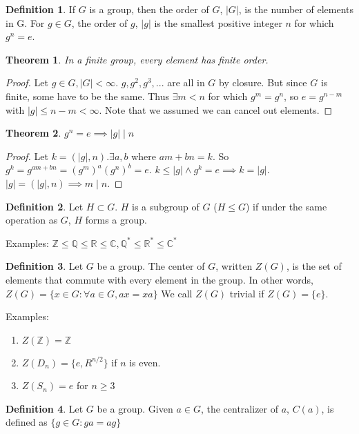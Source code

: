 \documentclass{article}
\theoremstyle{definition}
\newtheorem{definition}{Definition}
\theoremstyle{plain}
\newtheorem{theorem}{Theorem}
\theoremstyle{corollary}
\theoremstyle{lemma}
\begin{document}
\begin{definition}
If $G$ is a group, then the order of $G$, $|G|$, is the number of elements in G.
For $g\in G$, the order of $g$, $|g|$ is the smallest positive integer $n$ for which $g^n=e$. 
\end{definition}

\begin{theorem}
In a finite group, every element has finite order.
\end{theorem}
\begin{proof}
Let $g\in G, |G|<\infty$. $g,g^2,g^3,...$ are all in $G$ by closure. But since $G$ is finite, some have to be the same. Thus $\exists m<n$ for which $g^m=g^n$, so $e=g^{n-m}$ with $|g|\leq n-m<\infty$. Note that we assumed we can cancel out elements. 
\end{proof}

\begin{theorem}
    $g^n=e\implies|g|\mid n$
\end{theorem}
\begin{proof}
Let $k=(|g|,n). \exists a,b$ where $am+bn=k$. So $g^k=g^{am+bn}=(g^m)^a(g^n)^b=e$. $k\leq |g| \land g^k=e\implies k=|g|$. $|g|=(|g|,n)\implies m\mid n$.
\end{proof}

\begin{definition}
Let $H\subset G$. $H$ is a subgroup of $G$ ($H\leq G$) if under the same operation as $G$, $H$ forms a group.
\end{definition}

Examples: $\mathbb{Z}\leq\mathbb{Q}\leq\mathbb{R}\leq\mathbb{C},\mathbb{Q}^*\leq\mathbb{R}^*\leq\mathbb{C}^*$

\begin{definition}
Let $G$ be a group. The center of $G$, written $Z(G)$, is the set of elements that commute with every element in the group. In other words, $Z(G)=\{x\in G:\forall a\in G,ax=xa\}$
We call $Z(G)$ trivial if $Z(G)=\{e\}$.
\end{definition}

Examples:
\begin{enumerate}
    \item $Z(\mathbb{Z})=\mathbb{Z}$
    \item $Z(D_n)=\{e,R^{n/2}\}$ if $n$ is even.
    \item $Z(S_n)={e}$ for $n\geq3$
\end{enumerate}

\begin{definition}
Let $G$ be a group. Given $a\in G$, the centralizer of $a$, $C(a)$, is defined as $\{g\in G:ga=ag\}$
\end{definition}
\end{document}

